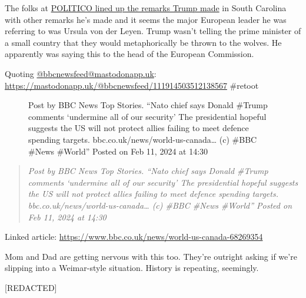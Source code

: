 The folks at
\href{https://web.archive.org/web/20240211202913/https://www.politico.com/newsletters/playbook/2024/02/11/wild-and-dangerous-trump-upstages-elderly-biden-00140853?nname=playbook&nid=0000014f-1646-d88f-a1cf-5f46b7bd0000&nrid=00000171-1404-d255-a375-74bd15840000&nlid=630318}{POLITICO
lined up the remarks Trump made} in South Carolina with other remarks
he's made and it seems the major European leader he was referring to was
Ursula von der Leyen. Trump wasn't telling the prime minister of a small
country that they would metaphorically be thrown to the wolves. He
apparently was saying this to the head of the European Commission.

Quoting
\href{https://mastodonapp.uk/@bbcnewsfeed/}{@bbcnewsfeed@mastodonapp.uk}:
\url{https://mastodonapp.uk/@bbcnewsfeed/111914503512138567} \#retoot

\begin{figure}
\centering
{}
\caption{Post by BBC News Top Stories. ``Nato chief says Donald \#Trump
comments `undermine all of our security' The presidential hopeful
suggests the US will not protect allies failing to meet defence spending
targets. bbc.co.uk/news/world-us-canada\ldots{} (c) \#BBC \#News
\#World'' Posted on Feb 11, 2024 at 14:30}
\end{figure}

\begin{quote}
\emph{Post by BBC News Top Stories. ``Nato chief says Donald \#Trump
comments `undermine all of our security' The presidential hopeful
suggests the US will not protect allies failing to meet defence spending
targets. bbc.co.uk/news/world-us-canada\ldots{} (c) \#BBC \#News
\#World'' Posted on Feb 11, 2024 at 14:30}
\end{quote}

Linked article:
\url{https://www.bbc.co.uk/news/world-us-canada-68269354}

Mom and Dad are getting nervous with this too. They're outright asking
if we're slipping into a Weimar-style situation. History is repeating,
seemingly.

{[}REDACTED{]}
